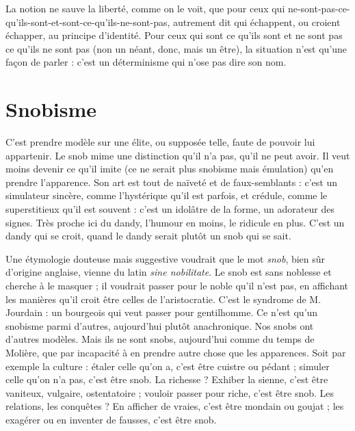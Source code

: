 La notion ne sauve la liberté, comme on le voit, que pour ceux qui
ne-sont-pas-ce-qu'ils-sont-et-sont-ce-qu'ils-ne-sont-pas, autrement dit qui échappent,
ou croient échapper, au principe d'identité. Pour ceux qui sont ce qu’ils sont et
ne sont pas ce qu'ils ne sont pas (non un néant, donc, mais un être), la situation
n’est qu’une façon de parler : c’est un déterminisme qui n’ose pas dire son
nom.

\section{Snobisme}
C’est prendre modèle sur une élite, ou supposée telle, faute de
pouvoir lui appartenir. Le snob mime une distinction qu’il n’a
pas, qu’il ne peut avoir. Il veut moins devenir ce qu'il imite (ce ne serait plus
snobisme mais émulation) qu’en prendre l'apparence. Son art est tout de naïveté
et de faux-semblants : c’est un simulateur sincère, comme l’hystérique
qu'il est parfois, et crédule, comme le superstitieux qu'il est souvent : c’est un
idolâtre de la forme, un adorateur des signes. Très proche ici du dandy,
l’humour en moins, le ridicule en plus. C’est un dandy qui se croit, quand le
dandy serait plutôt un snob qui se sait.

Une étymologie douteuse mais suggestive voudrait que le mot {\it snob}, bien
sûr d’origine anglaise, vienne du latin {\it sine nobilitate}. Le snob est sans noblesse
et cherche à le masquer ; il voudrait passer pour le noble qu’il n’est pas, en affichant
les manières qu’il croit être celles de l'aristocratie. C’est le syndrome de
M. Jourdain : un bourgeois qui veut passer pour gentilhomme. Ce n’est qu’un
snobisme parmi d’autres, aujourd’hui plutôt anachronique. Nos snobs ont
d’autres modèles. Mais ils ne sont snobs, aujourd’hui comme du temps de
Molière, que par incapacité à en prendre autre chose que les apparences. Soit
par exemple la culture : étaler celle qu’on a, c’est être cuistre ou pédant ;
simuler celle qu’on n’a pas, c’est être snob. La richesse ? Exhiber la sienne, c’est
être vaniteux, vulgaire, ostentatoire ; vouloir passer pour riche, c’est être snob.
Les relations, les conquêtes ? En afficher de vraies, c’est être mondain ou
goujat ; les exagérer ou en inventer de fausses, c’est être snob.

